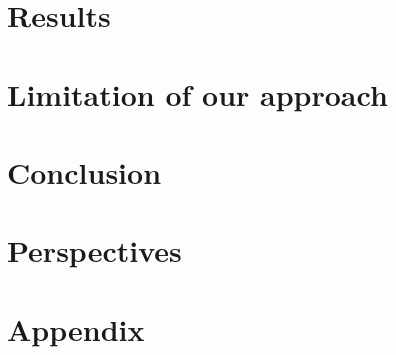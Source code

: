 \documentclass[oneside, a4paper, onecolumn, 11pt]{article}
\begin{document}
\section{Results}

\section{Limitation of our approach}

\section{Conclusion}

\section{Perspectives}

\newpage
\nocite{*}



\newpage
\appendix

\section{Appendix}
\label{sec:appendix}
\end{document}
